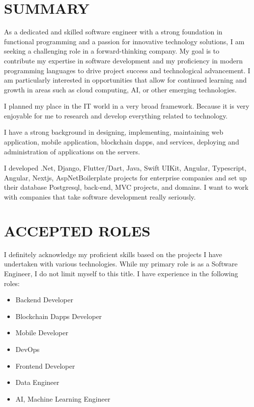 \documentclass[line,margin]{res}
\begin{document}
\address{emre.yildiz.dev@hotmail.com}
\address{\href{https://linkedin.com/in/emre-yildiz-297ab0242}{ Linkedin}} 


 
\begin{resume}
 
\section{SUMMARY}  As a dedicated and skilled software engineer with a strong foundation in functional programming and a passion for innovative technology solutions, I am seeking a challenging role in a forward-thinking company. My goal is to contribute my expertise in software development and my proficiency in modern programming languages to drive project success and technological advancement. I am particularly interested in opportunities that allow for continued learning and growth in areas such as cloud computing, AI, or other emerging technologies.
                
I planned my place in the IT world in a very broad framework. Because it is very enjoyable for me to research and develop everything related to technology.

I have a strong background in designing, implementing, maintaining web application, mobile application, blockchain dapps, and services, deploying and administration of applications  on the servers.

I developed .Net, Django, Flutter/Dart, Java, Swift UIKit, Angular, Typescript, Angular, Nextjs, AspNetBoilerplate projects for enterprise companies and set up their database Postgresql, back-end, MVC projects, and domains.
I want to work with companies that take software development really seriously.


\section{\textbf{ACCEPTED ROLES}} I definitely acknowledge my proficient skills based on the projects I have undertaken with various technologies. While my primary role is as a Software Engineer, I do not limit myself to this title. I have experience in the following roles:
\begin{itemize}
\item Backend Developer
\item Blockchain Dapps Developer
\item Mobile Developer
\item DevOps
\item Frontend Developer
\item Data Engineer
\item AI, Machine Learning Engineer
\end{itemize}


\end{resume}
\end{document}
